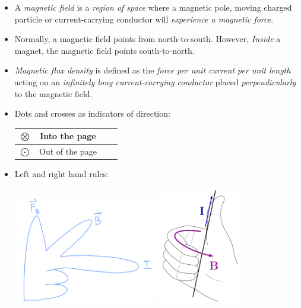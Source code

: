 \documentclass[oneside]{book}
\begin{document}
\begin{itemize}
    \item A \emph{magnetic field} is a \emph{region of space} where a magnetic pole, moving charged particle or current-carrying conductor will \emph{experience a magnetic force}.
    \item Normally, a magnetic field points from north-to-south. However, \emph{Inside} a magnet, the magnetic field points south-to-north. 
    \item \emph{Magnetic flux density} is defined as the \emph{force per unit current per unit length} acting on an \emph{infinitely long current-carrying conductor} placed \emph{perpendicularly} to the magnetic field.
    \item Dots and crosses as indicators of direction:
    \begin{center}
        \begin{tabular}{|Sc|Sc|}
            \hline
            \Large \(\bigotimes\) & Into the page\\
            \hline
            \Large \(\bigodot\) & Out of the page\\
            \hline
        \end{tabular}
    \end{center}
    \newpage
    \item Left and right hand rules:
    \begin{center}
        \includegraphics[width=0.5\textwidth]{../images/Left-Right-Hand-Rules/Left-hand-rule.png}
        \hspace{2cm}
        \includegraphics[width=0.28\textwidth]{../images/Left-Right-Hand-Rules/Right-hand-rule.pdf}

\end{center}
\end{itemize}
\end{document}
